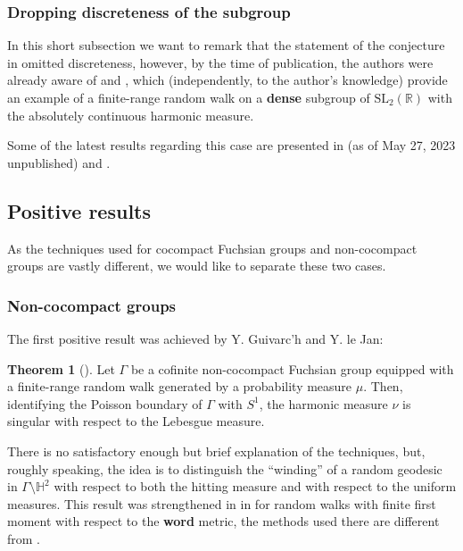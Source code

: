 \documentclass[11pt]{amsart}
\theoremstyle{definition}
\newtheorem{theorem}{Theorem}[section]
\begin{document}
	\subsubsection{Dropping discreteness of the subgroup}
	In this short subsection we want to remark that the statement of the conjecture in \cite{kaimanovich2011matrix} omitted discreteness, however, by the time of publication, the authors were already aware of \cite{Bourgain2012} and \cite{MR2969625}, which (independently, to the author's knowledge) provide an example of a finite-range random walk on a \textbf{dense} subgroup of $\text{SL}_2(\mathbb{R})$ with the absolutely continuous harmonic measure.
	
	Some of the latest results regarding this case are presented in (as of May 27, 2023 unpublished) \cite{kogler2022local} and \cite{kittle2023absolutely}.
		
	\subsection{Positive results}
	
	As the techniques used for cocompact Fuchsian groups and non-cocompact groups are vastly different, we would like to separate these two cases.
	
	\subsubsection{Non-cocompact groups}
	
	The first positive result was achieved by Y. Guivarc'h and Y. le Jan:
	
	\begin{theorem}[\cite{guivarch1990}]
		\label{IntT: singular for non-cocompact}
		Let $\Gamma$ be a cofinite non-cocompact Fuchsian group equipped with a finite-range random walk generated by a probability measure $\mu$. Then, identifying the Poisson boundary of $\Gamma$ with $S^1$, the harmonic measure $\nu$ is singular with respect to the Lebesgue measure. 
	\end{theorem}
	
	There is no satisfactory enough but brief explanation of the techniques, but, roughly speaking, the idea is to distinguish the ``winding'' of a random geodesic in $\Gamma \setminus \mathbb{H}^2$ with respect to both the hitting measure and with respect to the uniform measures. This result was strengthened in \cite{MR2568439} in 
	\cite{Gadre2015WordLS} for random walks with finite first moment with respect to the \textbf{word} metric, the methods used there are different from \cite{guivarch1990}.
	
\end{document}
